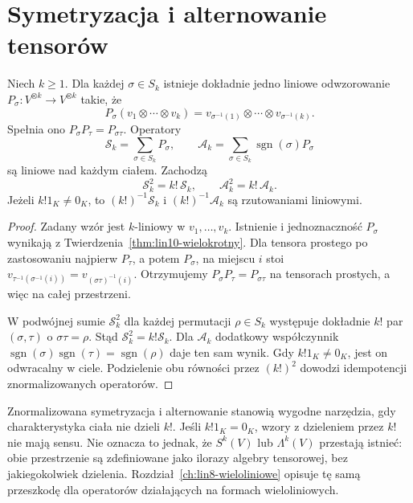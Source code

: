 \section{Symetryzacja i alternowanie tensorów}
\label{sec:lin11-projekcje}

\begin{stwierdzenie}
\label{prop:lin11-permutacje}
Niech \(k\ge1\).
Dla każdej \(\sigma\in S_k\)
istnieje dokładnie jedno liniowe
odwzorowanie
\(P_\sigma\colon V^{\otimes k}\to V^{\otimes k}\)
takie, że
\[
 P_\sigma(v_1\otimes\cdots\otimes v_k)
 =v_{\sigma^{-1}(1)}\otimes\cdots
  \otimes v_{\sigma^{-1}(k)}.
\]
Spełnia ono
\(P_\sigma P_\tau=P_{\sigma\tau}\).
Operatory
\[
 \mathcal S_k=\sum_{\sigma\in S_k}P_\sigma,
 \qquad
 \mathcal A_k=\sum_{\sigma\in S_k}
                \operatorname{sgn}(\sigma)P_\sigma
\]
są liniowe nad każdym ciałem.
Zachodzą
\[
 \mathcal S_k^2=k!\,\mathcal S_k,\qquad
 \mathcal A_k^2=k!\,\mathcal A_k.
\]
Jeżeli \(k!1_K\ne0_K\),
to \((k!)^{-1}\mathcal S_k\)
i \((k!)^{-1}\mathcal A_k\)
są rzutowaniami liniowymi.
\end{stwierdzenie}
\begin{proof}
Zadany wzór jest \(k\)-liniowy
w \(v_1,\ldots,v_k\).
Istnienie i jednoznaczność
\(P_\sigma\) wynikają z
Twierdzenia~\ref{thm:lin10-wielokrotny}.
Dla tensora prostego po
zastosowaniu najpierw \(P_\tau\),
a potem \(P_\sigma\),
na miejscu \(i\) stoi
\(v_{\tau^{-1}(\sigma^{-1}(i))}
=v_{(\sigma\tau)^{-1}(i)}\).
Otrzymujemy
\(P_\sigma P_\tau=P_{\sigma\tau}\)
na tensorach prostych, a więc
na całej przestrzeni.

W podwójnej sumie
\(\mathcal S_k^2\)
dla każdej permutacji
\(\rho\in S_k\) występuje
dokładnie \(k!\) par
\((\sigma,\tau)\) o \(\sigma\tau=\rho\).
Stąd \(\mathcal S_k^2=k!\mathcal S_k\).
Dla \(\mathcal A_k\) dodatkowy
współczynnik
\(\operatorname{sgn}(\sigma)
\operatorname{sgn}(\tau)
=\operatorname{sgn}(\rho)\)
daje ten sam wynik.
Gdy \(k!1_K\ne0_K\),
jest on odwracalny w ciele.
Podzielenie obu równości
przez \((k!)^2\) dowodzi
idempotencji znormalizowanych
operatorów.
\end{proof}

\begin{uwaga}
\label{rem:lin11-kchar}
Znormalizowana symetryzacja
i alternowanie stanowią
wygodne narzędzia, gdy
charakterystyka ciała nie dzieli \(k!\).
Jeśli \(k!1_K=0_K\),
wzory z dzieleniem przez \(k!\)
nie mają sensu.
Nie oznacza to jednak, że
\(S^k(V)\) lub \(\Lambda^k(V)\)
przestają istnieć:
obie przestrzenie są
zdefiniowane jako ilorazy
algebry tensorowej, bez
jakiegokolwiek dzielenia.
Rozdział~\ref{ch:lin8-wieloliniowe}
opisuje tę samą przeszkodę
dla operatorów działających
na formach wieloliniowych.
\end{uwaga}

